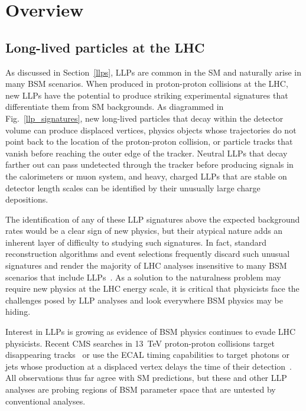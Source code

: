\section{Overview}
\label{overview}
\subsection{Long-lived particles at the LHC}
As discussed in Section~\ref{llps}, LLPs are common in the SM and naturally arise in many BSM scenarios. When produced in proton-proton collisions at the LHC, new LLPs have the potential to produce striking experimental signatures that differentiate them from SM backgrounds. As diagrammed in Fig.~\ref{llp_signatures}, new long-lived particles that decay within the detector volume can produce displaced vertices, physics objects whose trajectories do not point back to the location of the proton-proton collision, or particle tracks that vanish before reaching the outer edge of the tracker. Neutral LLPs that decay farther out can pass undetected through the tracker before producing signals in the calorimeters or muon system, and heavy, charged LLPs that are stable on detector length scales can be identified by their unusually large charge depositions.



The identification of any of these LLP signatures above the expected background rates would be a clear sign of new physics, but their atypical nature adds an inherent layer of difficulty to studying such signatures. In fact, standard reconstruction algorithms and event selections frequently discard such unusual signatures and render the majority of LHC analyses insensitive to many BSM scenarios that include LLPs~\cite{llp_whitepaper}. As a solution to the naturalness problem may require new physics at the LHC energy scale, it is critical that physicists face the challenges posed by LLP analyses and look everywhere BSM physics may be hiding.

Interest in LLPs is growing as evidence of BSM physics continues to evade LHC physicists. Recent CMS searches in \SI{13}{\TeV} proton-proton collisions target disappearing tracks~\cite{disappearing_tracks} or use the ECAL timing capabilities to target photons or jets whose production at a displaced vertex delays the time of their detection~\cite{delayed_photons, delayed_jets}. All observations thus far agree with SM predictions, but these and other LLP analyses are probing regions of BSM parameter space that are untested by conventional analyses.

